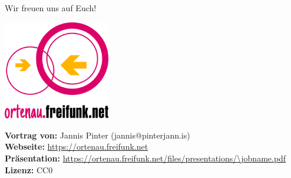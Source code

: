 \documentclass[10pt]{beamer}
\begin{document}
  \begin{frame}{Wir freuen uns auf Euch!}
    \begin{center}
      \hspace{1em}\includegraphics[width=0.35\textwidth]{images/freifunk_ortenau_logo_1000.png}\\
    \end{center}
	\textbf{Vortrag von:}	Jannis Pinter (jannis@pinterjann.is)\\
        \textbf{Webseite:}	\url{https://ortenau.freifunk.net}\\
        \textbf{Präsentation:}	\url{https://ortenau.freifunk.net/files/presentations/\jobname.pdf}\\
        \textbf{Lizenz:}	CC0
  \end{frame}
\end{document}
